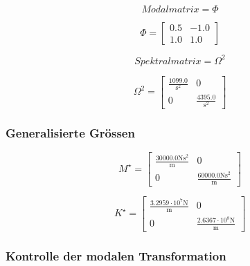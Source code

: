 \documentclass[
  letterpaper,
  DIV=11]{scrreprt}
\begin{document}
\begin{equation}Modalmatrix = \Phi\end{equation}

\begin{equation}\Phi = \left[\begin{matrix}0.5 & -1.0\\1.0 & 1.0\end{matrix}\right]\end{equation}

\begin{equation}Spektralmatrix = \Omega^{2}\end{equation}

\begin{equation}\Omega^{2} = \left[\begin{matrix}\frac{1099.0}{\text{s}^{2}} & 0\\0 & \frac{4395.0}{\text{s}^{2}}\end{matrix}\right]\end{equation}

\hypertarget{generalisierte-gruxf6ssen-2}{%
\subsubsection{Generalisierte
Grössen}\label{generalisierte-gruxf6ssen-2}}

\begin{equation}M^{\star} = \left[\begin{matrix}\frac{30000.0 \text{N} \text{s}^{2}}{\text{m}} & 0\\0 & \frac{60000.0 \text{N} \text{s}^{2}}{\text{m}}\end{matrix}\right]\end{equation}

\begin{equation}K^{\star} = \left[\begin{matrix}\frac{3.2959 \cdot 10^{7} \text{N}}{\text{m}} & 0\\0 & \frac{2.6367 \cdot 10^{8} \text{N}}{\text{m}}\end{matrix}\right]\end{equation}

\hypertarget{kontrolle-der-modalen-transformation-2}{%
\subsubsection{Kontrolle der modalen
Transformation}\label{kontrolle-der-modalen-transformation-2}}
\end{document}
